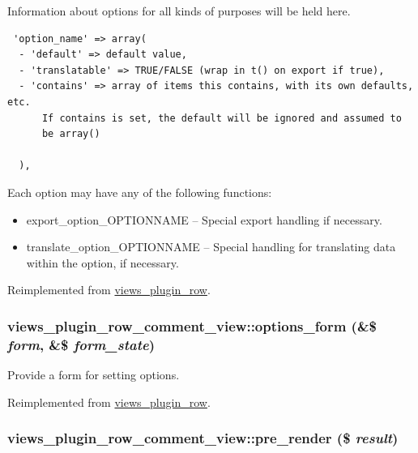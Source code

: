 Information about options for all kinds of purposes will be held here. 

\begin{Code}\begin{verbatim} 'option_name' => array(
  - 'default' => default value,
  - 'translatable' => TRUE/FALSE (wrap in t() on export if true),
  - 'contains' => array of items this contains, with its own defaults, etc.
      If contains is set, the default will be ignored and assumed to
      be array()

  ),
\end{verbatim}
\end{Code}

 Each option may have any of the following functions:\begin{itemize}
\item export\_\-option\_\-OPTIONNAME -- Special export handling if necessary.\item translate\_\-option\_\-OPTIONNAME -- Special handling for translating data within the option, if necessary. \end{itemize}


Reimplemented from \hyperlink{classviews__plugin__row_ad6be1492eae8605e9aff37da9f19337}{views\_\-plugin\_\-row}.\hypertarget{classviews__plugin__row__comment__view_7dd276ec1a14a2d34f80a8020557608a}{
\subsubsection[{options\_\-form}]{\setlength{\rightskip}{0pt plus 5cm}views\_\-plugin\_\-row\_\-comment\_\-view::options\_\-form (\&\$ {\em form}, \/  \&\$ {\em form\_\-state})}}
\label{classviews__plugin__row__comment__view_7dd276ec1a14a2d34f80a8020557608a}


Provide a form for setting options. 

Reimplemented from \hyperlink{classviews__plugin__row_6914c39d64977a0aa71da39cc1af004e}{views\_\-plugin\_\-row}.\hypertarget{classviews__plugin__row__comment__view_0cb891a0afff2975d9a04c9d879ee5a5}{
\subsubsection[{pre\_\-render}]{\setlength{\rightskip}{0pt plus 5cm}views\_\-plugin\_\-row\_\-comment\_\-view::pre\_\-render (\$ {\em result})}}
\label{classviews__plugin__row__comment__view_0cb891a0afff2975d9a04c9d879ee5a5}


